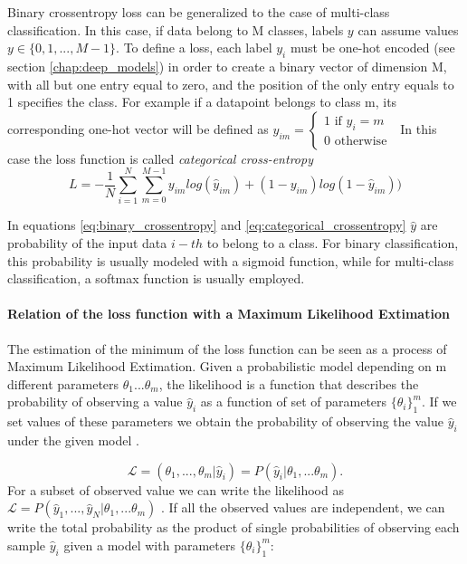 \documentclass[11pt]{report}
\begin{document}
Binary crossentropy loss can be generalized to the case of multi-class classification.
In this case, if data belong to M classes, labels $y$ can assume values $y \in \{0, 1, ..., M-1\}$.
To define a loss, each label $y_i$ must be one-hot encoded (see section \ref{chap:deep_models}) in order to create a binary vector of dimension M, with all but one entry equal to zero, and the position of the only entry equals to 1 specifies the class.
For example if a datapoint belongs to class m, its corresponding one-hot vector will be defined as $y_{im} = \begin{cases} 1  \text{ if } y_i = m \\ 0 \text{ otherwise }\end{cases}$
In this case the loss function is called \emph{categorical cross-entropy}
\begin{equation}\label{eq:categorical_crossentropy}
L = -\frac{1}{N} \sum_{i=1}^N \sum_{m=0}^{M-1}y_{im} log(\hat y_{im}) + (1-y_{im})log(1- \hat y_{im}))
\end{equation}

In equations \ref{eq:binary_crossentropy} and \ref{eq:categorical_crossentropy} $\hat y$ are probability of the input data $i-th$ to belong to a class.
For binary classification, this probability is usually modeled with a sigmoid function, while for multi-class classification, a softmax function is usually employed.

\paragraph{Relation of the loss function with a Maximum Likelihood Extimation}
\hfill

\noindent The estimation of the minimum of the loss function can be seen as a process of Maximum Likelihood Extimation.
Given a probabilistic model depending on m different parameters $\theta_1 ... \theta_m$, the likelihood is a function that describes the probability of observing a value $\hat y_i$ as a function of set of parameters $\{\theta_i \}_1 ^m$.
If we set values of these parameters we obtain the probability of observing the value $\hat y_i$ under the given model \cite{baldini2021}.

\begin{equation}
 \mathcal{L} = (\theta_1, ..., \theta_m | \hat y_i) = P(\hat y_i|\theta_1, ...\theta_m).
\end{equation}
For a subset of observed value we can write the likelihood as $\mathcal{L} = P(\hat y_1, ..., \hat y_N | \theta_1, ...\theta_m)$ .
If all the observed values are independent, we can write the total probability as the product of single probabilities of observing each sample $\hat y_i$ given a model with parameters $\{\theta_i \}_1 ^m$:
\end{document}
